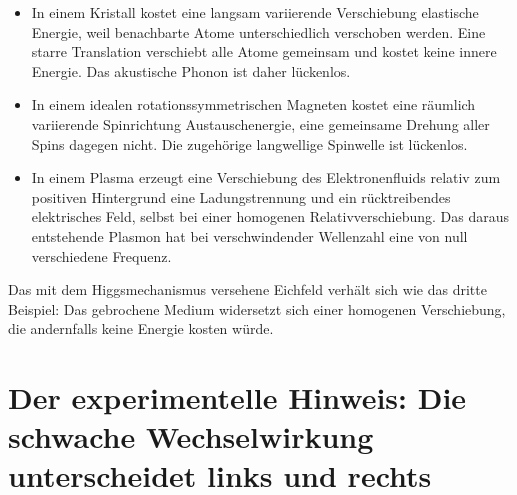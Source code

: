 \begin{itemize}
  \item In einem Kristall kostet eine langsam variierende Verschiebung elastische Energie, weil benachbarte Atome unterschiedlich verschoben werden. Eine starre Translation verschiebt alle Atome gemeinsam und kostet keine innere Energie. Das akustische Phonon ist daher lückenlos.
  \item In einem idealen rotationssymmetrischen Magneten kostet eine räumlich variierende Spinrichtung Austauschenergie, eine gemeinsame Drehung aller Spins dagegen nicht. Die zugehörige langwellige Spinwelle ist lückenlos.
  \item In einem Plasma erzeugt eine Verschiebung des Elektronenfluids relativ zum positiven Hintergrund eine Ladungstrennung und ein rücktreibendes elektrisches Feld, selbst bei einer homogenen Relativverschiebung. Das daraus entstehende Plasmon hat bei verschwindender Wellenzahl eine von null verschiedene Frequenz.
\end{itemize}

Das mit dem Higgsmechanismus versehene Eichfeld verhält sich wie das dritte Beispiel: Das gebrochene Medium widersetzt sich einer homogenen Verschiebung, die andernfalls keine Energie kosten würde.

\begin{classroomqa}
\end{classroomqa}

\begin{classroomqa}
\end{classroomqa}

\section{Der experimentelle Hinweis: Die schwache Wechselwirkung unterscheidet links und rechts}

